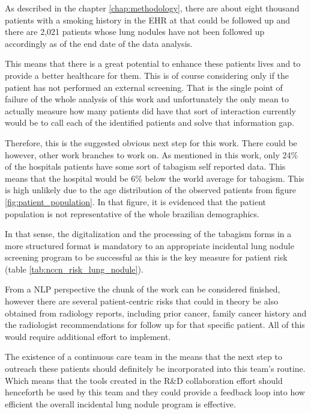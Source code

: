\label{chap:conclusion}

As described in the chapter \ref{chap:methodology}, there are about eight thousand patients with a smoking history in the EHR at \nomeHslShort{} that could be followed up and there are 2,021 patients whose lung nodules have not been followed up accordingly as of the end date of the data analysis.

This means that there is a great potential to enhance these patients lives and to provide a better healthcare for them. This is of course considering only if the patient has not performed an external screening. That is the single point of failure of the whole analysis of this work and unfortunately the only mean to actually measure how many patients did have that sort of interaction currently would be to call each of the identified patients and solve that information gap.

Therefore, this is the suggested obvious next step for this work. There could be however, other work branches to work on. As mentioned in this work, only 24\% of the hospitals patients have some sort of tabagism self reported data. This means that the hospital would be 6\% below the world average for tabagism. This is high unlikely due to the age distribution of the observed patients from figure \ref{fig:patient_population}. In that figure, it is evidenced that the \nomeHslShort{} patient population is not representative of the whole brazilian demographics.%

In that sense, the digitalization and the processing of the tabagism forms in a more structured format is mandatory to an appropriate incidental lung nodule screening program to be successful as this is the key measure for patient risk (table \ref{tab:nccn_risk_lung_nodule}). 

From a NLP perspective the chunk of the work can be considered finished, however there are several patient-centric risks that could in theory be also obtained from radiology reports, including prior cancer, family cancer history and the radiologist recommendations for follow up for that specific patient. All of this would require additional effort to implement.

The existence of a continuous care team in the \nomeHsl{} means that the next step to outreach these patients should definitely be incorporated into this team's routine. Which means that the tools created in the R\&D collaboration effort should henceforth be used by this team and they could provide a feedback loop into how efficient the overall incidental lung nodule program is effective. 

